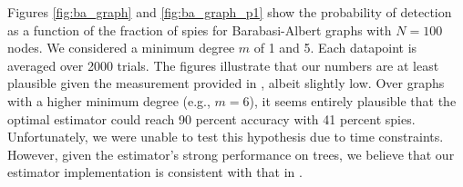 Figures \ref{fig:ba_graph} and \ref{fig:ba_graph_p1} show the probability of detection as a function of the fraction of spies for Barabasi-Albert graphs with $N=100$ nodes. We considered a minimum degree $m$ of 1 and 5. Each datapoint is averaged over 2000 trials. The figures illustrate that our numbers are at least plausible given the measurement provided in \cite{pinto}, albeit slightly low. Over graphs with a higher minimum degree (e.g., $m=6$), it seems entirely plausible that the optimal estimator could reach 90 percent accuracy with 41 percent spies. Unfortunately, we were unable to test this hypothesis due to time constraints. However, given the estimator's strong performance on trees, we believe that our estimator implementation is consistent with that in \cite{pinto}. %

